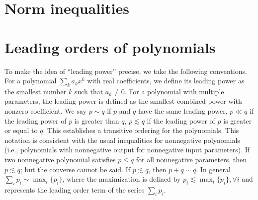 \documentclass[aps,pra,reprint,superscriptaddress]{revtex4-2}
\begin{document}
\section{Norm inequalities}\label{app:norm-ineq}

\section{Leading orders of polynomials}\label{app:polynomials}

To make the idea of ``leading power'' precise, we take the following conventions. 
For a polynomial $\sum_{k} a_k x^k$ with real coefficients, we define its leading power as the smallest number $k$ such that $a_k\neq 0$. For a polynomial with multiple parameters, the leading power is defined as the smallest combined power with nonzero coefficient.
We say $p\mathbin{\sim}q$ if $p$ and $q$ have the same leading power, $p\ll q$ if the leading power of $p$ is greater than $q$, $p\lesssim q$ if the leading power of $p$ is greater or equal to $q$. This establishes a transitive ordering for the polynomials. This notation is consistent with the usual inequalities for nonnegative polynomials (i.e., polynomials with nonnegative output for nonnegative input parameters). If two nonnegative polynomial satisfies $p\le q$ for all nonnegative parameters, then $p\lesssim q$; but the converse cannot be said.
If $p\lesssim q$, then $p+q \sim q$. In general $\sum_i p_i \sim \max_i \{ p_i \}$, where the maximization is defined by $p_i \lesssim \max_i \{ p_i \}, \forall i$ and represents the leading order term of the series $\sum_i p_i$. 
\end{document}

